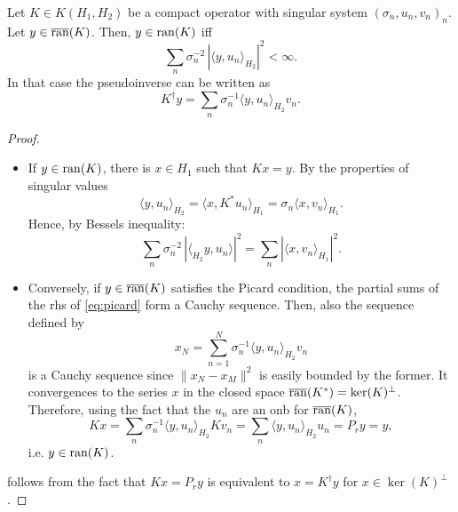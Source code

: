 \begin{lemma}
\begin{thm}
\label{thm:pinv_picard}
    Let $K \in K(H_1,H_2)$ be a compact operator with 
    singular system $(\sigma_n, u_n, v_n)_n$.
    Let $y \in \overline{\operatorname{ran}}(K)$.
    Then, $y \in \operatorname{ran}(K)$ iff
    \begin{equation} \label{eq:picard}
        \sum_{n} \sigma_n^{-2} 
        \, |\langle y,u_n \rangle_{H_2}|^2 < \infty.
    \end{equation}
    In that case the pseudoinverse can be written as
    \begin{equation} \label{eq:pinv_svd}
        K^\dagger y = \sum_n \sigma_n^{-1} 
        \langle y,u_n \rangle_{H_2} v_n.
    \end{equation}
\end{thm}
\begin{proof}
    \begin{itemize}
        \item If $y \in \operatorname{ran}(K)$, there is $x \in H_1$ 
            such that $Kx = y$.
            By the properties of singular values
            \begin{equation*}
                \langle y, u_n \rangle_{H_2} 
                = \langle x, K^* u_n \rangle_{H_1}
                = \sigma_n \langle x, v_n \rangle_{H_1}.
            \end{equation*}
            Hence, by Bessels inequality:
            \begin{equation*}
                \sum_n \sigma_n^{-2}
                    \,|\langle_{H_2} y,u_n \rangle|^2
                = \sum_n |\langle x, v_n \rangle_{H_1}|^2.
            \end{equation*}
        \item Conversely, if $y \in \overline{\operatorname{ran}}(K)$ satisfies 
            the Picard condition, the partial sums of the rhs
            of \cref{eq:picard} form a Cauchy sequence.
            Then, also the sequence defined by 
            \begin{equation*}
                x_N = \sum_{n=1}^N \sigma_n^{-1} 
                \langle y,u_n\rangle_{H_2} v_n
            \end{equation*}
            is a Cauchy sequence since $\|x_N - x_M\|^2$ is easily 
            bounded by the former.
            It convergences to the series $x$ in the closed space
            $\overline{\operatorname{ran}}(K^*) = \ker(K)^\perp$.
            Therefore, using the fact that the $u_n$ are an onb 
            for $\overline{\operatorname{ran}}(K)$,
            \begin{equation*}
                Kx = \sum_n \sigma_n^{-1} 
                    \langle y,u_n \rangle_{H_2} K v_n
                = \sum_n \langle y,u_n \rangle_{H_2} u_n
                = P_r y = y,
            \end{equation*}
            i.e. $y \in \operatorname{ran}(K)$.
    \end{itemize}
     follows from the fact that $Kx = P_r y$
    is equivalent to $x = K^\dagger y$ for $x \in \ker(K)^\perp$.
\end{proof}


\end{lemma}
